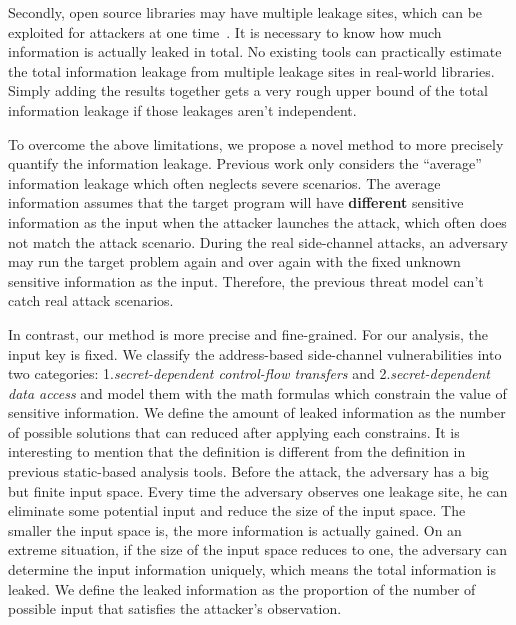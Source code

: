 Secondly, open source libraries may have multiple leakage sites, which can be exploited for attackers
at one time~\cite{191010,7163052,hornby2011side}. 
It is necessary to know how much information is actually leaked in total. 
No existing tools can practically estimate the total information leakage from multiple leakage sites in real-world libraries.
Simply adding the results together gets a very rough upper bound of the total information leakage if those 
leakages aren’t independent. 


To overcome the above limitations, we propose a novel method
to more precisely quantify the information leakage. Previous work only considers the
``average'' information leakage which often neglects severe scenarios.
The average information assumes that the target program will have \textbf{different} sensitive 
information as the input when the attacker launches the attack,
which often does not match the attack scenario. During the real side-channel
attacks, an adversary may run the target problem again and over again with the 
fixed unknown sensitive information as the input. Therefore, the previous
threat model can't catch real attack scenarios.

In contrast, our method is more precise and fine-grained. 
For our analysis, the input key is fixed. We classify the address-based side-channel 
vulnerabilities into two categories: 1.\textit{secret-dependent control-flow transfers} 
and 2.\textit{secret-dependent data access} and model them with the math formulas which
constrain the value of sensitive information.
We define the amount of leaked information as the number of possible solutions that can
reduced after applying each constrains.
It is interesting to mention that the definition is different from the 
definition in previous static-based analysis tools. 
Before the attack, the adversary has a big but finite input space.
Every time the adversary observes one leakage site, he can eliminate some potential input and
reduce the size of the input space. The smaller the input space is, the more information is 
actually gained. On an extreme situation, if the size of the input space reduces to one, the
adversary can determine the input information uniquely, which means the total information is 
leaked. We define the leaked information as the proportion of the number of possible input 
that satisfies the attacker's observation.

